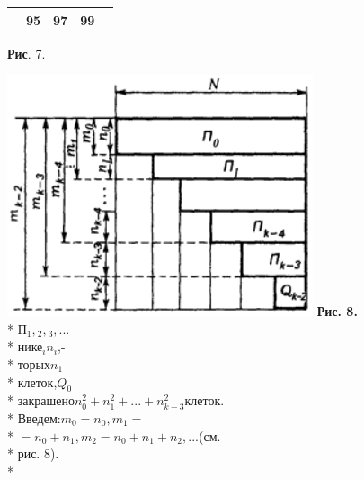 \documentclass{article}
\begin{document}
\begin{multicols}{2}
\begin{center}
\begin{tabularx}{0.47\textwidth} { 
  | >{\centering\arraybackslash}X
  | >{\centering\arraybackslash}X
  | >{\centering\arraybackslash}X 
  | >{\centering\arraybackslash}X 
  | >{\centering\arraybackslash}X  | }
 & \vspace*{-2.2mm}95\vspace*{0.5mm} & \vspace*{-2.2mm}97\vspace*{0.5mm}
 & \vspace*{-2.2mm}99\vspace*{0.5mm} \\
 
 \hline
\end{tabularx}
\end{center}
\textbf{Рис}. 7.

\end{multicols}
\begin{multicols}{2}
\includegraphics[width=\linewidth]{Image_3.png}
  \textbf{Рис. 8.}\\*
П$_1,$$_2,$$_3, ...$-\\*
нике$_i$\hfill$n_i$,-\\*
торых\hfill$n_1$\\*
клеток,\hfill$Q_0$\\*
закрашено\hfill$n_0^2 + n_1^2 + ... + n_{k-3}^2$клеток.\\*
Введем:\hfill$m_0 = n_0, m_1 =$\\*
$= n_0 + n_1, m_2 = n_0 + n_1 + n_2, ...$\hfill(см.\\*
рис. 8).\\*

\end{multicols}
\end{document}
